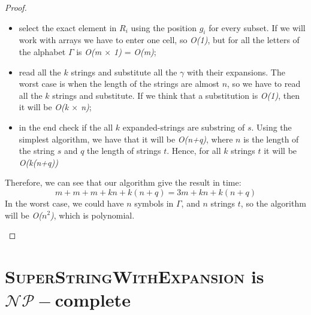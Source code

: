 \documentclass[paper=a4, fontsize=11pt]{scrartcl}
\numberwithin{equation}{section}		%
\numberwithin{figure}{section}			%
\numberwithin{table}{section}				%
\begin{document}
\begin{proof}
\begin{enumerate}
\begin{itemize}
	        	\item select the exact element in $R_i$ using the position $g_i$ for every subset. If we will work with arrays we have to enter one cell, so \textit{O(1)}, but for all the letters of the alphabet $\Gamma$ is \textit{O(m $\times$ 1)} = \textit{O(m)};
	        	\item read all the $k$ strings and substitute all the $\gamma$ with their expansions. The worst case is when the length of the strings are almost $n$, so we have to read all the $k$ strings and substitute. If we think that a substitution is \textit{O(1)}, then it will be \textit{O(k $\times$ n)};
	        	\item in the end check if the all $k$ expanded-strings are substring of $s$. Using the simplest algorithm, we have that it will be \textit{O(n+q)}, where $n$ is the length of the string $s$ and $q$ the length of strings $t$. Hence, for all $k$ strings $t$ it will be \textit{O(k(n+q))}
	        \end{itemize}
        Therefore, we can see that our algorithm give the result in time:
        $$m+m+m+kn+k(n+q) = 3m+kn+k(n+q) $$
        In the worst case, we could have $n$ symbols in $\mathcal{\Gamma}$, and $n$ strings $t$, so the algorithm will be \textit{O($n^2$)}, which is polynomial.          
\end{enumerate}
\end{proof}

\section{\textsc{SuperStringWithExpansion} is $\mathcal{NP}-$complete}
\end{document}
